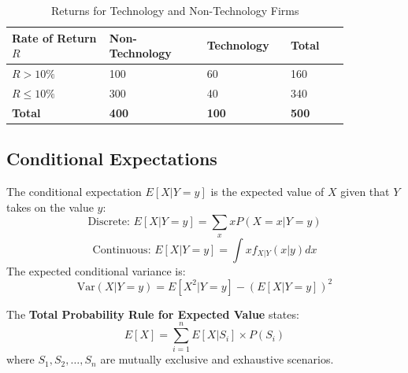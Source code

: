 \begin{table}[!htbp]
\centering
\caption{Returns for Technology and Non-Technology Firms}
\label{tab:contingency_tech_m6}
\begin{tabular}{p{0.25\linewidth} p{0.25\linewidth} p{0.20\linewidth} p{0.15\linewidth}}
\toprule
\textbf{Rate of Return} $R$ & \textbf{Non-Technology} & \textbf{Technology} & \textbf{Total} \\
\midrule
$R > 10\%$  & 100 & 60  & 160 \\
$R \le 10\%$ & 300 & 40  & 340 \\
\midrule
\textbf{Total} & \textbf{400} & \textbf{100} & \textbf{500} \\
\bottomrule
\end{tabular}
\end{table}

\subsection{Conditional Expectations}
	\label{subsec:Conditional Expectations}
The conditional expectation $E[X | Y=y]$ is the expected value of $X$ given that $Y$ takes on the value $y$:
\begin{equation}
	\text{Discrete: } E[X|Y=y] = \sum_x x P(X=x | Y=y)
	\label{eq:discrete_cond_mean_m6}
\end{equation}
\begin{equation}
	\text{Continuous: } E[X|Y=y] = \int x f_{X|Y}(x|y) dx
	\label{eq:continuous_cond_mean_m6}
\end{equation}
The expected conditional variance is:
\begin{equation}
	\text{Var}(X | Y=y) = E[X^2 | Y=y] - (E[X | Y=y])^2
	\label{eq:conditional_variance_m6}
\end{equation}


The \textbf{Total Probability Rule for Expected Value} states:
\begin{equation}
	E[X] = \sum_{i=1}^n E[X | S_i] \times P(S_i)
	\label{eq:total_prob_rule_expectation_m6}
\end{equation}
where $S_1, S_2, \dots, S_n$ are mutually exclusive and exhaustive scenarios.

